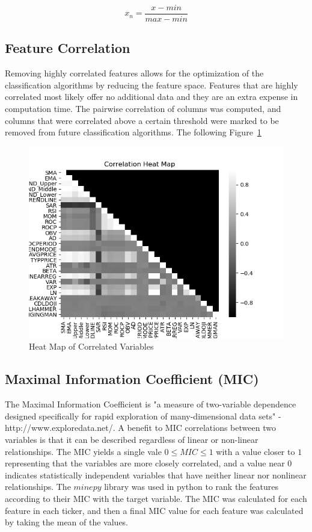 \documentclass{article}
\begin{document}
\begin{equation}\label{eq:norm}
	x_n = \frac{x - min}{max - min}
\end{equation}

\subsection{Feature Correlation}
Removing highly correlated features allows for the optimization of the classification algorithms by reducing the feature space. Features that are highly correlated most likely offer no additional data and they are an extra expense in computation time. The pairwise correlation of columns was computed, and columns that were correlated above a certain threshold were marked to be removed from future classification algorithms. The following Figure~\ref{fig:corr_heatmap}

\begin{figure}[h!]
	\centering
	\includegraphics[width=\linewidth]{data/heatmap.png}
	\caption{Heat Map of Correlated Variables}
	\label{fig:corr_heatmap}
\end{figure}

\subsection{Maximal Information Coefficient (MIC)}
The Maximal Information Coefficient is "a measure of two-variable dependence designed specifically for rapid exploration of many-dimensional data sets" - http://www.exploredata.net/. A benefit to MIC correlations between two variables is that it can be described regardless of linear or non-linear relationships. The MIC yields a single vale $0 \leq MIC \leq 1$ with a value closer to $1$ representing that the variables are more closely correlated, and a value near $0$ indicates statistically independent variables that have neither linear nor nonlinear relationships. The $minepy$ library was used in python to rank the features according to their MIC with the target variable. The MIC was calculated for each feature in each ticker, and then a final MIC value for each feature was calculated by taking the mean of the values.
\end{document}
